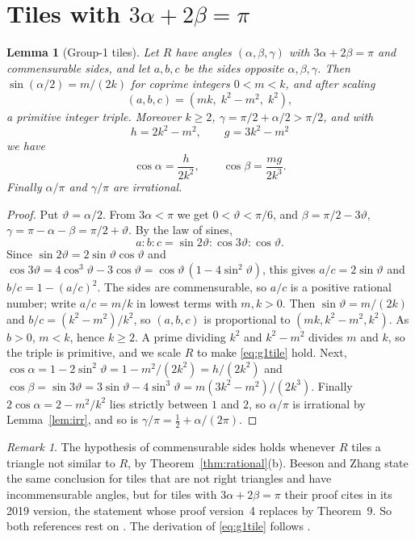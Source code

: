 \documentclass[11pt]{amsart}
\newtheorem{lemma}[theorem]{Lemma}
\theoremstyle{remark}
\newtheorem{remark}[theorem]{Remark}
\begin{document}
\section{Tiles with \texorpdfstring{$3\alpha+2\beta=\pi$}{3alpha+2beta=pi}}\label{sec:group1}

\begin{lemma}[Group-1 tiles]\label{lem:g1tile}
Let $R$ have angles $(\alpha,\beta,\gamma)$ with $3\alpha+2\beta=\pi$ and commensurable sides, and let $a,b,c$ be the sides opposite $\alpha,\beta,\gamma$. Then $\sin(\alpha/2)=m/(2k)$ for coprime integers $0<m<k$, and after scaling
\begin{equation}\label{eq:g1tile}
(a,b,c)=(mk,\;k^2-m^2,\;k^2),
\end{equation}
a primitive integer triple. Moreover $k\ge 2$, $\gamma=\pi/2+\alpha/2>\pi/2$, and with
\[
h=2k^2-m^2,\qquad g=3k^2-m^2
\]
we have
\begin{equation}\label{eq:g1cos}
\cos\alpha=\frac{h}{2k^2},\qquad \cos\beta=\frac{mg}{2k^3}.
\end{equation}
Finally $\alpha/\pi$ and $\gamma/\pi$ are irrational.
\end{lemma}

\begin{proof}
Put $\vartheta=\alpha/2$. From $3\alpha<\pi$ we get $0<\vartheta<\pi/6$, and $\beta=\pi/2-3\vartheta$, $\gamma=\pi-\alpha-\beta=\pi/2+\vartheta$. By the law of sines,
\[
a:b:c=\sin2\vartheta:\cos3\vartheta:\cos\vartheta .
\]
Since $\sin2\vartheta=2\sin\vartheta\cos\vartheta$ and $\cos3\vartheta=4\cos^3\vartheta-3\cos\vartheta=\cos\vartheta\,(1-4\sin^2\vartheta)$, this gives $a/c=2\sin\vartheta$ and $b/c=1-(a/c)^2$. The sides are commensurable, so $a/c$ is a positive rational number; write $a/c=m/k$ in lowest terms with $m,k>0$. Then $\sin\vartheta=m/(2k)$ and $b/c=(k^2-m^2)/k^2$, so $(a,b,c)$ is proportional to $(mk,k^2-m^2,k^2)$. As $b>0$, $m<k$, hence $k\ge2$. A prime dividing $k^2$ and $k^2-m^2$ divides $m$ and $k$, so the triple is primitive, and we scale $R$ to make \eqref{eq:g1tile} hold. Next, $\cos\alpha=1-2\sin^2\vartheta=1-m^2/(2k^2)=h/(2k^2)$ and $\cos\beta=\sin3\vartheta=3\sin\vartheta-4\sin^3\vartheta=m(3k^2-m^2)/(2k^3)$. Finally $2\cos\alpha=2-m^2/k^2$ lies strictly between $1$ and $2$, so $\alpha/\pi$ is irrational by Lemma~\ref{lem:irr}, and so is $\gamma/\pi=\tfrac12+\alpha/(2\pi)$.
\end{proof}

\begin{remark}\label{rem:g1rational}
The hypothesis of commensurable sides holds whenever $R$ tiles a triangle not similar to $R$, by Theorem~\ref{thm:rational}(b). Beeson and Zhang \cite[Theorem~1.2]{BZRat} state the same conclusion for tiles that are not right triangles and have incommensurable angles, but for tiles with $3\alpha+2\beta=\pi$ their proof cites \cite[Theorem~3]{Beeson2229} in its 2019 version, the statement whose proof version~4 replaces by Theorem~9. So both references rest on \cite[Theorem~9]{Beeson2229}. The derivation of \eqref{eq:g1tile} follows \cite[Lemmas~2--4]{Beeson2229}.
\end{remark}
\end{document}
